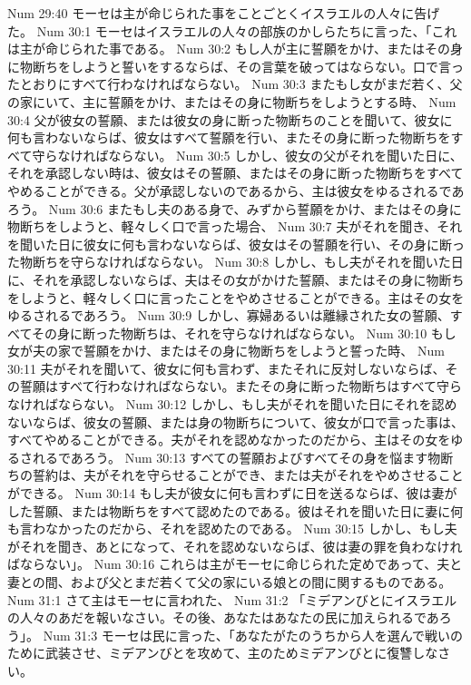 Num 29:40  モーセは主が命じられた事をことごとくイスラエルの人々に告げた。
Num 30:1  モーセはイスラエルの人々の部族のかしらたちに言った、「これは主が命じられた事である。
Num 30:2  もし人が主に誓願をかけ、またはその身に物断ちをしようと誓いをするならば、その言葉を破ってはならない。口で言ったとおりにすべて行わなければならない。
Num 30:3  またもし女がまだ若く、父の家にいて、主に誓願をかけ、またはその身に物断ちをしようとする時、
Num 30:4  父が彼女の誓願、または彼女の身に断った物断ちのことを聞いて、彼女に何も言わないならば、彼女はすべて誓願を行い、またその身に断った物断ちをすべて守らなければならない。
Num 30:5  しかし、彼女の父がそれを聞いた日に、それを承認しない時は、彼女はその誓願、またはその身に断った物断ちをすべてやめることができる。父が承認しないのであるから、主は彼女をゆるされるであろう。
Num 30:6  またもし夫のある身で、みずから誓願をかけ、またはその身に物断ちをしようと、軽々しく口で言った場合、
Num 30:7  夫がそれを聞き、それを聞いた日に彼女に何も言わないならば、彼女はその誓願を行い、その身に断った物断ちを守らなければならない。
Num 30:8  しかし、もし夫がそれを聞いた日に、それを承認しないならば、夫はその女がかけた誓願、またはその身に物断ちをしようと、軽々しく口に言ったことをやめさせることができる。主はその女をゆるされるであろう。
Num 30:9  しかし、寡婦あるいは離縁された女の誓願、すべてその身に断った物断ちは、それを守らなければならない。
Num 30:10  もし女が夫の家で誓願をかけ、またはその身に物断ちをしようと誓った時、
Num 30:11  夫がそれを聞いて、彼女に何も言わず、またそれに反対しないならば、その誓願はすべて行わなければならない。またその身に断った物断ちはすべて守らなければならない。
Num 30:12  しかし、もし夫がそれを聞いた日にそれを認めないならば、彼女の誓願、または身の物断ちについて、彼女が口で言った事は、すべてやめることができる。夫がそれを認めなかったのだから、主はその女をゆるされるであろう。
Num 30:13  すべての誓願およびすべてその身を悩ます物断ちの誓約は、夫がそれを守らせることができ、または夫がそれをやめさせることができる。
Num 30:14  もし夫が彼女に何も言わずに日を送るならば、彼は妻がした誓願、または物断ちをすべて認めたのである。彼はそれを聞いた日に妻に何も言わなかったのだから、それを認めたのである。
Num 30:15  しかし、もし夫がそれを聞き、あとになって、それを認めないならば、彼は妻の罪を負わなければならない」。
Num 30:16  これらは主がモーセに命じられた定めであって、夫と妻との間、および父とまだ若くて父の家にいる娘との間に関するものである。
Num 31:1  さて主はモーセに言われた、
Num 31:2  「ミデアンびとにイスラエルの人々のあだを報いなさい。その後、あなたはあなたの民に加えられるであろう」。
Num 31:3  モーセは民に言った、「あなたがたのうちから人を選んで戦いのために武装させ、ミデアンびとを攻めて、主のためミデアンびとに復讐しなさい。
